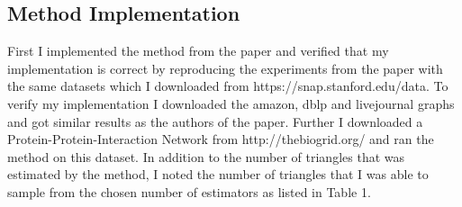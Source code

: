 \documentclass[12pt,twoside,a4paper]{report}
\begin{document}
\subsection{Method Implementation}
First I implemented the method from the paper and verified that my implementation is correct by reproducing the experiments from the paper with the same datasets which I downloaded from https://snap.stanford.edu/data. To verify my implementation I downloaded the amazon, dblp and livejournal graphs and got similar results as the authors of the paper. Further I downloaded a Protein-Protein-Interaction Network from http://thebiogrid.org/ and ran the method on this dataset. In addition to the number of triangles that was estimated by the method, I noted the number of triangles that I was able to sample from the chosen number of estimators as listed in Table 1. 
\begin{center}
\begin{table}
\caption{}
\end{table}
\end{center}
\end{document}
